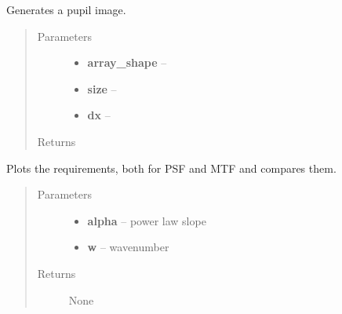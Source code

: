 \documentclass[a4paper,11pt,english]{sphinxmanual}
\begin{document}

\begin{fulllineitems}
\label{instrument:sandbox.MTF.pupilImage}
Generates a pupil image.
\begin{quote}\begin{description}
\item[{Parameters}] \leavevmode\begin{itemize}
\item {} 
\textbf{array\_shape} -- 

\item {} 
\textbf{size} -- 

\item {} 
\textbf{dx} -- 

\end{itemize}

\item[{Returns}] \leavevmode


\end{description}\end{quote}

\end{fulllineitems}


\begin{fulllineitems}
\label{instrument:sandbox.MTF.requirement}
Plots the requirements, both for PSF and MTF and compares them.
\begin{quote}\begin{description}
\item[{Parameters}] \leavevmode\begin{itemize}
\item {} 
\textbf{alpha} -- power law slope

\item {} 
\textbf{w} -- wavenumber

\end{itemize}

\item[{Returns}] \leavevmode
None

\end{description}\end{quote}

\end{fulllineitems}
\end{document}
